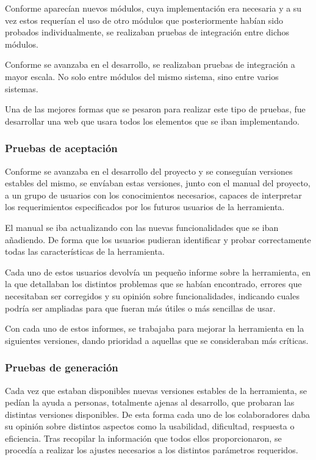 \documentclass[a4paper,12pt]{article}
\begin{document}
Conforme aparecían nuevos módulos, cuya implementación era necesaria y a su vez estos requerían el uso de otro módulos que
posteriormente habían sido probados individualmente, se realizaban pruebas de integración entre dichos módulos.

Conforme se avanzaba en el desarrollo, se realizaban pruebas de integración a mayor escala. No solo entre módulos
del mismo sistema, sino entre varios sistemas.

Una de las mejores formas que se pesaron para realizar este tipo de pruebas, fue desarrollar una web que usara todos los elementos
que se iban implementando.

\subsubsection{Pruebas de aceptación}

Conforme se avanzaba en el desarrollo del proyecto y se conseguían versiones estables del mismo, se
envíaban estas versiones, junto con el manual del proyecto, a un grupo de usuarios con los conocimientos
necesarios, capaces de interpretar los requerimientos especificados por los futuros usuarios de la herramienta.

El manual se iba actualizando con las nuevas funcionalidades que se iban añadiendo. De forma que
los usuarios pudieran identificar y probar correctamente todas las características de la herramienta.

Cada uno de estos usuarios devolvía un pequeño informe sobre la herramienta, en la que detallaban los distintos
problemas que se habían encontrado, errores que necesitaban ser corregidos y su opinión sobre
funcionalidades, indicando cuales podría ser ampliadas para que fueran más útiles o más sencillas de usar.

Con cada uno de estos informes, se trabajaba para mejorar la herramienta en la siguientes versiones, dando
prioridad a aquellas que se consideraban más críticas.

\subsubsection{Pruebas de generación}

Cada vez que estaban disponibles nuevas versiones estables de la herramienta, se pedían la ayuda a personas,
totalmente ajenas al desarrollo, que probaran las distintas versiones disponibles. De esta forma cada uno
de los colaboradores daba su opinión sobre  distintos aspectos como la usabilidad, dificultad, respuesta o eficiencia.
Tras recopilar la información que todos ellos proporcionaron, se procedía a realizar los ajustes
necesarios a los distintos parámetros requeridos.
\end{document}
